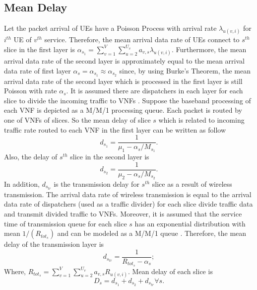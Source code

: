 \documentclass[conference]{IEEEtran}
\begin{document}
\subsection{Mean Delay}
Let the packet arrival of UEs have a Poisson Process with arrival rate $\lambda_{u(v,i)}$ for $i^{th}$ UE of $v^{th}$ service. 
Therefore, the mean arrival data rate of UEs connect to $s^{th}$ slice in the first layer is 
$\alpha_{s_1} = \sum_{v=1}^{V}\sum_{u=2}^{U_v}a_{v,s}\lambda_{u(v,i)}$.  
Furthermore, the mean arrival data rate of the second layer is approximately equal to the mean arrival data rate of first layer $\alpha_{s} =\alpha_{s_1} \approx \alpha_{s_2}$ since, by using Burke’s Theorem, the mean arrival data rate of the second layer which is processed in the first layer is still Poisson with rate $\alpha_{s}$. 
It is assumed there are dispatchers in each layer for each slice to divide the incoming traffic to VNFs \cite{frdl,luong2018novel,luong2018novel1}.
Suppose the baseband processing of each VNF is depicted as a M/M/1 processing queue.
Each packet is routed by one of VNFs of slices. So the mean delay of slice $s$ which is related to incoming traffic rate routed to
each VNF in the first layer can be written as follow
\begin{equation}
d_{s_1} = \frac{1}{\mu_1 - \alpha_{s}/{M_{s_1}}}.
\end{equation}
Also, the delay of $s^{th}$ slice in the second layer is
\begin{equation}
d_{s_2} = \frac{1}{\mu_2 - \alpha_{s}/{M_{s_2}}}.
\end{equation}
In addition, $d_{s_{tr}}$ is the transmission delay for $s^{th}$ slice as a result of wireless transmission. The arrival data rate of wireless transmission
 is equal to the arrival data rate of dispatchers (used as a traffic divider) for each slice divide traffic data and transmit divided traffic to VNFs.
Moreover, it is assumed that the service time of transmission queue for each slice $s$ has 
 an exponential distribution with mean $1/(R_{{tot}_s})$ and can be modeled as a M/M/1 queue \cite{frdl,luong2018novel,luong2018novel1}. Therefore, 
the mean delay of the transmission layer is 
\begin{equation}
d_{s_{tr}} = \frac{1}{R_{{tot}_s} - \alpha_{s}};
\end{equation}
Where, $R_{{tot}_s} =  \sum_{v=1}^{V}\sum_{u=2}^{U_v}a_{v,s}R_{u(v,i)}$.
Mean delay of each slice is
\begin{equation}
D_{s} = d_{s_1} + d_{s_2} + d_{s_{tr}} \forall s.
\end{equation} 
\end{document}
